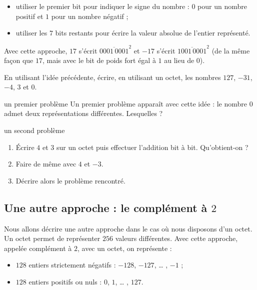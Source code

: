 \documentclass[a4paper,dvipsnames]{article}
\begin{document}
\begin{itemize}
  \item utiliser {\color{red}le premier bit pour indiquer le signe} du nombre : $0$ pour un nombre positif et $1$ pour un nombre négatif ;
  \item utiliser les $7$ bits restants pour écrire la {\color{red}valeur absolue} de l'entier représenté.
\end{itemize}

\smallskip

\begin{exemple}{}{}
  Avec cette approche, $17$ s'écrit $\overline{0001\,0001}^2$ et $-17$ s'écrit $\overline{1001\,0001}^2$ (de la même façon que $17$, mais avec le {bit \color{red}de poids fort} égal à $1$ au lieu de $0$).
\end{exemple}

\smallskip

\begin{exercice}{}{}
  En utilisant l'idée précédente, écrire, en utilisant un octet, les nombres $127$, $-31$, $-4$, $3$ et $0$.
\end{exercice}

\smallskip

\begin{remarque}{un premier problème}{}
  Un premier problème apparaît avec cette idée : le nombre $0$ admet deux représentations différentes. Lesquelles ?
\end{remarque}

\smallskip

\begin{remarque}{un second problème}{}
  \begin{enumerate}
    \item Écrire $4$ et $3$ sur un octet puis effectuer l'addition bit à bit. Qu'obtient-on ?
    \item Faire de même avec $4$ et $-3$.
    \item Décrire alors le problème rencontré.
  \end{enumerate}
\end{remarque}

\subsection{Une autre approche : le complément à $2$}

Nous allons décrire une autre approche dans le cas où nous disposons d'un octet. Un octet permet de représenter $256$ valeurs différentes. Avec cette approche, appelée {\color{red}\og{}complément à $2$\fg{}}, avec un octet, on représente :
\begin{itemize}
  \item $128$ entiers strictement négatifs : $-128$, $-127$, \dots{} , $-1$ ;
  \item $128$ entiers positifs ou nuls : $0$, $1$, \dots{} , $127$.
\end{itemize}
\end{document}
